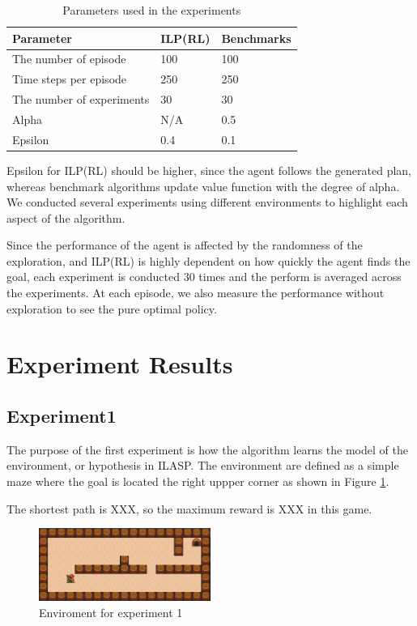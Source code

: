 \begin{table}[!ht!b]
\centering
\begin{tabular}{lll}
\hline
Parameter            & ILP(RL)    & Benchmarks      \\ \hline
The number of episode& 100        & 100        \\
Time steps per episode& 250        & 250        \\
The number of experiments& 30       & 30       \\
Alpha                & N/A       & 0.5       \\
Epsilon              & 0.4        & 0.1        \\
\end{tabular}
\caption{Parameters used in the experiments}
\label{param}
\end{table}

Epsilon for ILP(RL) should be higher, since the agent follows the generated plan, 
whereas benchmark algorithms update value function with the degree of alpha. 
We conducted several experiments using different environments to highlight each aspect of the algorithm.

Since the performance of the agent is affected by the randomness of the exploration, 
and ILP(RL) is highly dependent on how quickly the agent finds the goal, 
each experiment is conducted 30 times and the perform is averaged across the experiments.
At each episode, we also measure the performance without exploration to see the pure optimal policy.

\section{Experiment Results}
\label{learning_evaluation}

\subsection{Experiment1}
The purpose of the first experiment is how the algorithm learns the model of the environment, or hypothesis in ILASP.
The environment are defined as a simple maze where the goal is located the right uppper corner as shown in Figure \ref{experiment1}.

The shortest path is XXX, so the maximum reward is XXX in this game. 

\begin{figure}[!htb]
\centering
\includegraphics[width=0.5\textwidth]{./figures/experiment1}
\caption{Enviroment for experiment 1}
\label{experiment1}
\end{figure}

